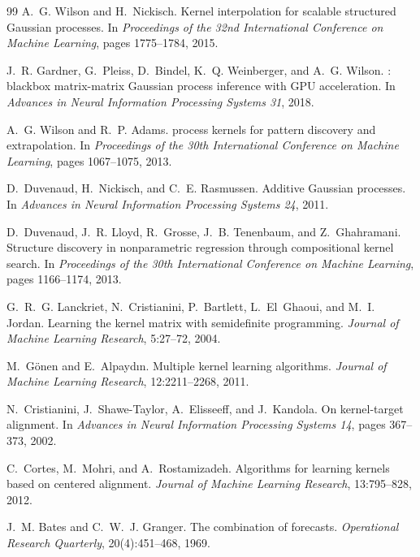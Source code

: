 \begin{thebibliography}{99}
A.~G. Wilson and H.~Nickisch.
\newblock Kernel interpolation for scalable structured {Gaussian} processes.
\newblock In \emph{Proceedings of the 32nd International Conference on Machine Learning},
pages 1775--1784, 2015.

J.~R. Gardner, G.~Pleiss, D.~Bindel, K.~Q. Weinberger, and A.~G. Wilson.
: blackbox matrix-matrix {Gaussian} process inference with {GPU}
acceleration.
\newblock In \emph{Advances in Neural Information Processing Systems 31}, 2018.

A.~G. Wilson and R.~P. Adams.
 process kernels for pattern discovery and extrapolation.
\newblock In \emph{Proceedings of the 30th International Conference on Machine Learning},
pages 1067--1075, 2013.

D.~Duvenaud, H.~Nickisch, and C.~E. Rasmussen.
\newblock Additive {Gaussian} processes.
\newblock In \emph{Advances in Neural Information Processing Systems 24}, 2011.

D.~Duvenaud, J.~R. Lloyd, R.~Grosse, J.~B. Tenenbaum, and Z.~Ghahramani.
\newblock Structure discovery in nonparametric regression through compositional kernel search.
\newblock In \emph{Proceedings of the 30th International Conference on Machine Learning},
pages 1166--1174, 2013.

G.~R.~G. Lanckriet, N.~Cristianini, P.~Bartlett, L.~El~Ghaoui, and M.~I. Jordan.
\newblock Learning the kernel matrix with semidefinite programming.
\newblock \emph{Journal of Machine Learning Research}, 5:27--72, 2004.

M.~G\"onen and E.~Alpayd\i{}n.
\newblock Multiple kernel learning algorithms.
\newblock \emph{Journal of Machine Learning Research}, 12:2211--2268, 2011.

N.~Cristianini, J.~Shawe-Taylor, A.~Elisseeff, and J.~Kandola.
\newblock On kernel-target alignment.
\newblock In \emph{Advances in Neural Information Processing Systems 14}, pages 367--373, 2002.

C.~Cortes, M.~Mohri, and A.~Rostamizadeh.
\newblock Algorithms for learning kernels based on centered alignment.
\newblock \emph{Journal of Machine Learning Research}, 13:795--828, 2012.

J.~M. Bates and C.~W.~J. Granger.
\newblock The combination of forecasts.
\newblock \emph{Operational Research Quarterly}, 20(4):451--468, 1969.


\end{thebibliography}
